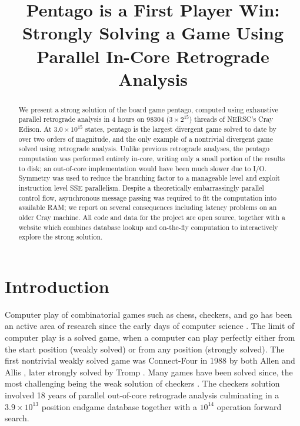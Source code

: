 \documentclass[conference]{IEEEtran}
\begin{document}
\title{Pentago is a First Player Win: Strongly Solving a Game Using Parallel In-Core Retrograde Analysis}
\author{}

\maketitle

\begin{abstract}
\boldmath
We present a strong solution of the board game pentago, computed using exhaustive parallel
retrograde analysis in 4 hours on 98304 ($3 \times 2^{15}$) threads of NERSC's Cray Edison.
At $3.0 \times 10^{15}$ states, pentago is the largest divergent game solved to date by
over two orders of magnitude, and the only example of a nontrivial divergent game solved
using retrograde analysis.
Unlike previous retrograde analyses, the pentago computation was performed entirely in-core,
writing only a small portion of the results to disk; an out-of-core implementation would
have been much slower due to I/O.  Symmetry was used to reduce the branching factor
to a manageable level and exploit instruction level SSE parallelism.  Despite a theoretically
embarrassingly parallel control flow, asynchronous message passing was required to fit the
computation into available RAM; we report on several consequences including latency problems
on an older Cray machine.  All code and data for the project are
open source, together with a website which combines database lookup and on-the-fly computation
to interactively explore the strong solution.
\end{abstract}

\IEEEpeerreviewmaketitle

\vspace{-.05in}
\section{Introduction}

Computer play of combinatorial games such as chess, checkers, and go has been an active area of research
since the early days of computer science \cite{shannon1950chess}.  The limit of computer play is a solved
game, when a computer can play perfectly either from the start position (weakly solved) or from any
position (strongly solved).  The first nontrivial weakly solved game was Connect-Four in 1988 by both
Allen and Allis \cite{allis1988connectfour}, later strongly solved by Tromp \cite{tromp1995}.  Many games
have been solved since, the most challenging being the weak solution of checkers \cite{schaeffer2007checkers}.
The checkers solution involved 18 years of parallel out-of-core retrograde analysis culminating in a
$3.9 \times 10^{13}$ position endgame database together with a $10^{14}$ operation forward search.
\end{document}
